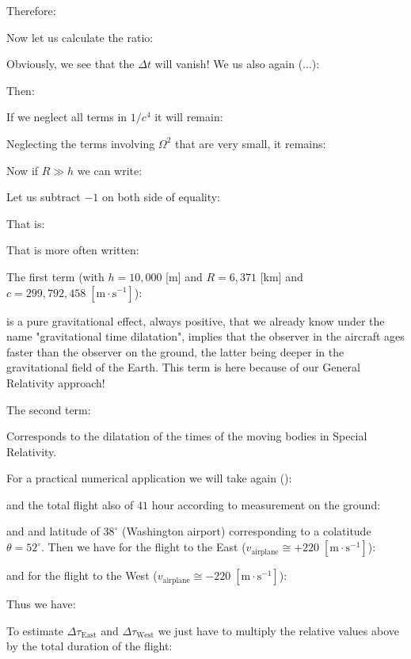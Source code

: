 	Therefore:
	
	Now let us calculate the ratio:
	
	Obviously, we see that the $\Delta t$ will vanish! We us also again (...):
	
	Then:
	
	If we neglect all terms in $1/c^4$ it will remain:
	
	Neglecting the terms involving $\Omega^2$ that are very small, it remains:
	
	Now if $R\gg h$ we can write:
	 
	Let us subtract $-1$ on both side of equality:
	 
	That is:
	 
	That is more often written:
	 
	The first term (with $h=10,000$ [m] and $R=6,371$ [km] and $c=299,792,458\;[\text{m}\cdot\text{s}^{-1}]$):
	
	is a pure gravitational effect, always positive, that we already know under the name "gravitational time dilatation", implies that the observer in the aircraft ages faster than the observer on the ground, the latter being deeper in the gravitational field of the Earth. This term is here because of our General Relativity approach! 
	
	The second term:
	
	Corresponds to the dilatation of the times of the moving bodies in Special Relativity.
	
	For a practical numerical application we will take again ():
	
	and the total flight also of $41$ hour according to measurement on the ground:
	
	and and latitude of $38^\circ$ (Washington airport) corresponding to a colatitude $\theta=52^\circ$. Then we have for the flight to the East ($v_\text{airplane}\cong +220\;[\text{m}\cdot\text{s}^{-1}]$):
	
	and for the flight to the West ($v_\text{airplane}\cong -220\;[\text{m}\cdot\text{s}^{-1}]$):
	
	Thus we have:
	
	To estimate $\Delta \tau_\text{East}$ and $\Delta\tau_\text{West}$ we just have to multiply the relative values above by the total duration of the flight:
	
